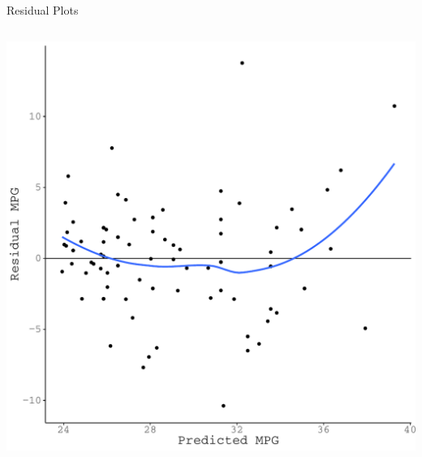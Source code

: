 \documentclass{beamer}\usepackage[]{graphicx}\usepackage[]{color}
\makeatletter
\def\maxwidth{ %
  \ifdim\Gin@nat@width>\linewidth
    \linewidth
  \else
    \Gin@nat@width
  \fi
}
\newenvironment{knitrout}{}{} %
\makeatother
\begin{document}
\begin{frame}{Residual Plots}
\begin{columns}
\begin{column}{0.5\textwidth}
\begin{knitrout}
{\centering \includegraphics[width=\maxwidth]{figure/unnamed-chunk-17-1} 

}



\end{knitrout}

\end{column}
\end{columns}
  
\end{frame}

\end{document}
